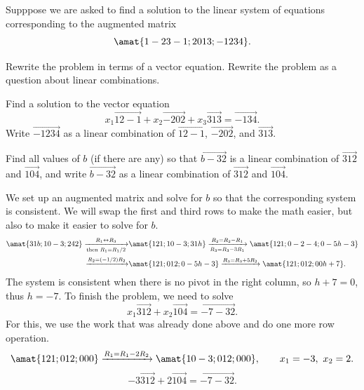 \begin{problems}
\problem %
Supppose we are asked to find a solution to the linear system of
equations corresponding to the augmented matrix
\[\amat{1 -2 3 -1; 2 0 1 3; -1 2 3 4}.\]
\begin{subproblems}
  \subproblem Rewrite the problem in terms of a vector equation.
  \subproblem Rewrite the problem as a question about linear
  combinations.
\end{subproblems}

\begin{solution}
  \begin{subproblems}
    \subproblem Find a solution to the vector equation
    \[x_1 \vec{1 2 -1} + x_2 \vec{-2 0 2} + x_3 \vec{3 1 3} = \vec{-1
        3 4}.\] %
    \subproblem Write $\vec{-1 2 3 4}$ as a linear combination of
    $\vec{1 2 -1}$, $\vec{-2 0 2}$, and $\vec{3 1 3}$.
  \end{subproblems}
\end{solution}

\problem %
Find all values of $b$ (if there are any) so that $\vec{b -3 2}$ is a
linear combination of $\vec{3 1 2}$ and $\vec{1 0 4}$, and write
$\vec{b -3 2}$ as a linear combination of $\vec{3 1 2}$ and
$\vec{1 0 4}$.

\begin{solution}
  We set up an augmented matrix and solve for $b$ so that the
  corresponding system is consistent.  We will swap the first and
  third rows to make the math easier, but also to make it easier to
  solve for $b$.
  \begin{align*}
    \amat{3 1 b; 1 0 -3; 2 4 2}
    \xrightarrow[\textup{then } R_1 = R_1 / 2]{R_1 \leftrightarrow R_3}
    &
      \amat{1 2 1; 1 0 -3; 3 1 h}
      \xrightarrow[R_3 = R_3 - 3R_1]{R_2 = R_2 - R_1}
      \amat{1 2 1; 0 -2 -4; 0 -5 h-3}
    \\
    \xrightarrow[]{R_2 = (-1/2)R_2}
    &
      \amat{1 2 1; 0 1 2; 0 -5 h-3}
      \xrightarrow[]{R_3 = R_3 + 5R_2}
      \amat{1 2 1; 0 1 2; 0 0 h+7}.
  \end{align*}
  The system is consistent when there is no pivot in the right column,
  so $h+7=0$, thus $h = -7$.  To finish the problem, we need to solve
  \[x_1 \vec{3 1 2} + x_2 \vec{1 0 4} = \vec{-7 -3 2}.\] For this, we
  use the work that was already done above and do one more row
  operation.
  \begin{align*}
    \amat{1 2 1; 0 1 2; 0 0 0}
    \xrightarrow[]{R_1 = R_1 - 2R_2}
    \amat{1 0 -3; 0 1 2; 0 0 0}, \qquad x_1 = -3, \ x_2 = 2.
  \end{align*}
  \[-3 \vec{3 1 2} + 2 \vec{1 0 4} = \vec{-7 -3 2}.\]  
\end{solution}


\end{problems}
